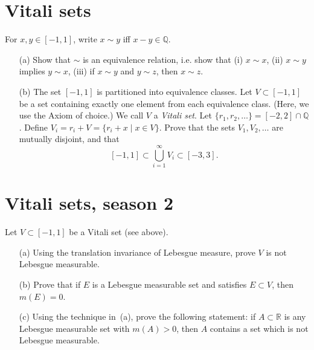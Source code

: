 \documentclass[lang=cn,11pt]{elegantbook}
\begin{document}
\section{Vitali sets}
  For $x, y\in [-1,1]$, write $x\sim y$ iff $x-y\in \mathbb{Q}$. 
  \begin{itemize}
  \item[(a)]
    Show that $\sim$ is an equivalence relation, i.e. show that (i) $x\sim x$, (ii) $x\sim y$ implies $y\sim x$, (iii) if $x\sim y$ and $y\sim z$, then $x\sim z$.
  \item[(b)]
    The set $[-1,1]$ is partitioned into equivalence classes. Let $V\subset[-1,1]$ be a set containing exactly one element from each equivalence class. (Here, we use the Axiom of choice.) We call $V$ a \emph{Vitali set}. 
    Let $\{r_1, r_2,\dots\} =[-2,2]\cap \mathbb{Q}$. Define $V_i= r_i+V=\{r_i+x\mid x\in V\}$.
    Prove that the sets $V_1, V_2, \dots$ are mutually disjoint, and that 
    \[
      [-1, 1]\subset \bigcup_{i=1}^\infty V_i \subset [-3,3].
    \]
  \end{itemize}

\section{Vitali sets, season 2}
  Let $V\subset[-1,1]$ be a Vitali set (see above).
  \begin{itemize}
  \item[(a)]
    Using the translation invariance of Lebesgue measure, prove $V$ is not Lebesgue
    measurable.
  \item[(b)]
    Prove that if $E$ is a Lebesgue measurable set and satisfies $E\subset V$, then $m(E)=0$. 
  \item[(c)]
    Using the technique in~(a), prove the following statement: if $A\subset\mathbb{R}$ is any Lebesgue measurable set with $m(A)>0$, then $A$ contains a set which is not Lebesgue measurable. 
  \end{itemize}
\end{document}
